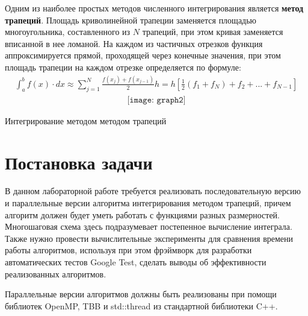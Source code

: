\documentclass{report}
\begin{document}
\par Одним из наиболее простых методов численного интегрирования является \textbf{метод трапеций}. Площадь криволинейной трапеции заменяется площадью многоугольника, составленного из $N$ трапеций, при этом кривая заменяется вписанной в нее ломаной. На каждом из частичных отрезков функция аппроксимируется прямой, проходящей через конечные значения, при этом площадь трапеции на каждом отрезке определяется по формуле:
\begin{align*}
    \int_{a}^{b}f(x)\cdot dx \approx \sum_{j=1}^{N} \frac{f(x_j)+f(x_{j-1})}{2}h=h\left[ \frac{1}{2}(f_1+f_N)+f_2+...+f_{N-1} \right]
\end{align*}
\begin{align*}
    \texttt{[image: graph2]}
\end{align*}
\begin{center}
    \caption{Интегрирование методом методом трапеций}
\end{center}
\newpage

\section*{Постановка задачи}
\par В данном лабораторной работе требуется реализовать последовательную версию и параллельные версии алгоритма интегрирования методом трапеций, причем алгоритм должен будет уметь работать с функциями разных размерностей. Многошаговая схема здесь подразумевает постепенное вычисление интеграла. Также нужно провести вычислительные эксперименты для сравнения времени работы алгоритмов, используя при этом фрэймворк для разработки автоматических тестов Google Test, сделать выводы об эффективности реализованных алгоритмов.
\par Параллельные версии алгоритмов должны быть реализованы при помощи библиотек OpenMP, TBB и std::thread из стандартной библиотеки C++.
\newpage

\end{document}
